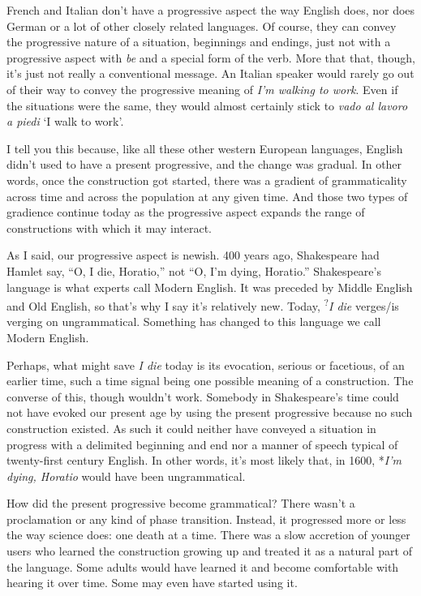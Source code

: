 French and Italian don't have a progressive aspect the way English does, nor does German or a lot of other closely related languages. Of course, they can convey the progressive nature of a situation, beginnings and endings, just not with a progressive aspect with \textit{be} and a special form of the verb. More that that, though, it's just not really a conventional message. An Italian speaker would rarely go out of their way to convey the progressive meaning of \textit{I'm walking to work}. Even if the situations were the same, they would almost certainly stick to \textit{vado al lavoro a piedi} `I walk to work'.

\bigskip

I tell you this because, like all these other western European languages, English didn't used to have a present progressive, and the change was gradual. In other words, once the construction got started, there was a gradient of grammaticality across time and across the population at any given time. And those two types of gradience continue today as the progressive aspect expands the range of constructions with which it may interact.

As I said, our progressive aspect is newish. 400 years ago, Shakespeare had Hamlet say, ``O, I die, Horatio,'' not ``O, I'm dying, Horatio.'' Shakespeare's language is what experts call Modern English. It was preceded by Middle English and Old English, so that's why I say it's relatively new. Today, \textsuperscript{?}\textit{I die} verges/is verging on ungrammatical. Something has changed to this language we call Modern English.

Perhaps, what might save \textit{I die} today is its evocation, serious or facetious, of an earlier time, such a time signal being one possible meaning of a construction. The converse of this, though wouldn't work. Somebody in Shakespeare's time could not have evoked our present age by using the present progressive because no such construction existed. As such it could neither have conveyed a situation in progress with a delimited beginning and end nor a manner of speech typical of twenty-first century English. In other words, it's most likely that, in 1600, *\textit{I'm dying, Horatio} would have been ungrammatical.

How did the present progressive become grammatical? There wasn't a proclamation or any kind of phase transition. Instead, it progressed more or less the way science does: one death at a time. There was a slow accretion of younger users who learned the construction growing up and treated it as a natural part of the language. Some adults would have learned it and become comfortable with hearing it over time. Some may even have started using it.

